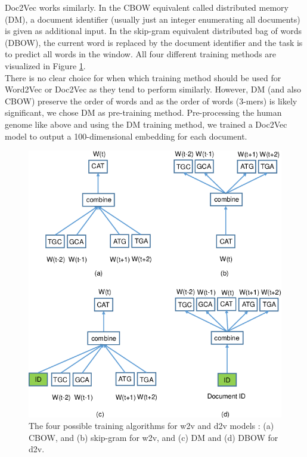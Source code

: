Doc2Vec works similarly. In the CBOW equivalent called distributed memory (DM), a document identifier (usually just an integer enumerating all documents) is given as additional input. In the skip-gram equivalent distributed bag of words (DBOW), the current word is replaced by the document identifier and the task is to predict all words in the window. All four different training methods are visualized in Figure \ref{fig:w2vd2vtrainingvariants}.\\
There is no clear choice for when which training method should be used for Word2Vec or Doc2Vec as they tend to perform similarly. However, DM (and also CBOW) preserve the order of words and as the order of words (3-mers) is likely significant, we chose DM as pre-training method.
Pre-processing the human genome like above and using the DM training method, we trained a Doc2Vec model to output a 100-dimensional embedding for each document.

\begin{figure}
	\centering\includegraphics[width=1\textwidth]{../visualizations/ch4-methods/w2v_d2v_training_variants.png} 
	\caption{
		The four possible training algorithms for w2v and d2v models \cite{d2vsplicing}: (a) CBOW, and (b) skip-gram for w2v, and (c) DM and (d) DBOW for d2v. 
	}
	\label{fig:w2vd2vtrainingvariants}
\end{figure}

